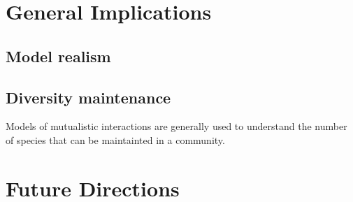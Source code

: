 \begin{refsection}
\section*{General Implications}
\subsection*{Model realism}
\subsection*{Diversity maintenance}
Models of mutualistic interactions are generally used to understand the number of species that can be maintainted in a community.

\section*{Future Directions}

\printbibliography
\end{refsection}
